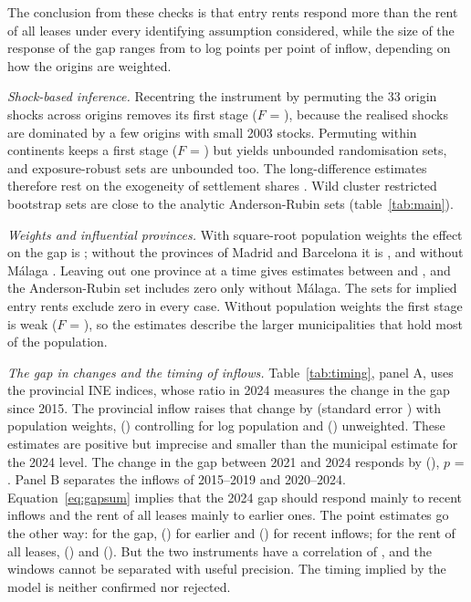 \documentclass[11pt,a4paper]{article}
\begin{document}
The conclusion from these checks is that entry rents respond more than the rent of all leases under every identifying assumption considered, while the size of the response of the gap ranges from \gmmGap{} to \bGap{} log points per point of inflow, depending on how the origins are weighted.

\textit{Shock-based inference.} Recentring the instrument by permuting the 33 origin shocks across origins removes its first stage ($F$ = \riFall), because the realised shocks are dominated by a few origins with small 2003 stocks. Permuting within continents keeps a first stage ($F$ = \riFcont) but yields unbounded randomisation sets, and exposure-robust sets \citep{adao2019} are unbounded too. The long-difference estimates therefore rest on the exogeneity of settlement shares \citep{goldsmith2020}. Wild cluster restricted bootstrap sets are close to the analytic Anderson-Rubin sets (table~\ref{tab:main}).

\textit{Weights and influential provinces.} With square-root population weights the effect on the gap is \rSqGap{} \rSqGapAR; without the provinces of Madrid and Barcelona it is \rMbGap{} \rMbGapAR, and without Málaga \rMaGap{} \rMaGapAR. Leaving out one province at a time gives estimates between \lopoMin{} and \lopoMax, and the Anderson-Rubin set includes zero only without Málaga. The sets for implied entry rents exclude zero in every case. Without population weights the first stage is weak ($F$ = \unwGapF), so the estimates describe the larger municipalities that hold most of the population.



\textit{The gap in changes and the timing of inflows.} Table~\ref{tab:timing}, panel A, uses the provincial INE indices, whose ratio in 2024 measures the change in the gap since 2015. The provincial inflow raises that change by \pvLev{} (standard error \pvLevSe) with population weights, \pvLevL{} (\pvLevLSe) controlling for log population and \pvLevU{} (\pvLevUSe) unweighted. These estimates are positive but imprecise and smaller than the municipal estimate for the 2024 level. The change in the gap between 2021 and 2024 responds by \pvChg{} (\pvChgSe), $p$ = \pvChgP. Panel B separates the inflows of 2015--2019 and 2020--2024. Equation~\eqref{eq:gapsum} implies that the 2024 gap should respond mainly to recent inflows and the rent of all leases mainly to earlier ones. The point estimates go the other way: for the gap, \wOldGap{} (\wOldGapSe) for earlier and \wNewGap{} (\wNewGapSe) for recent inflows; for the rent of all leases, \wOldStock{} (\wOldStockSe) and \wNewStock{} (\wNewStockSe). But the two instruments have a correlation of \wCorr, and the windows cannot be separated with useful precision. The timing implied by the model is neither confirmed nor rejected.
\end{document}
